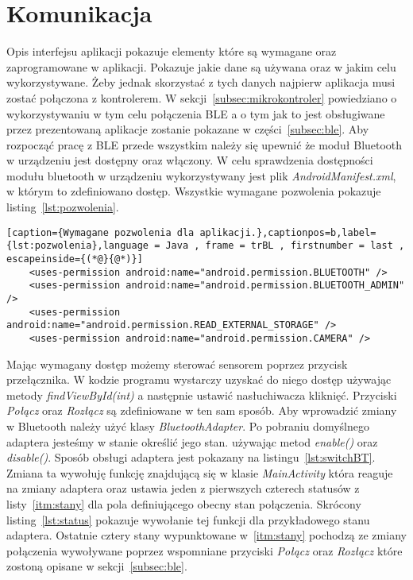 \section{Komunikacja}
\label{sec:komunikacja}
Opis interfejsu aplikacji pokazuje elementy które są wymagane oraz zaprogramowane w aplikacji. Pokazuje jakie dane są używana oraz w jakim celu wykorzystywane. Żeby jednak skorzystać z tych danych najpierw aplikacja musi zostać połączona z kontrolerem. W sekcji~\ref{subsec:mikrokontroler} powiedziano o wykorzystywaniu w tym celu połączenia BLE a o tym jak to jest obsługiwane przez prezentowaną aplikacje zostanie pokazane w części~\ref{subsec:ble}. Aby rozpocząć pracę z BLE przede wszystkim należy się upewnić że moduł Bluetooth w urządzeniu jest dostępny oraz włączony. W celu sprawdzenia dostępności modułu bluetooth w urządzeniu wykorzystywany jest plik \textit{AndroidManifest.xml}, w którym to zdefiniowano dostęp. Wszystkie wymagane pozwolenia pokazuje listing~\ref{lst:pozwolenia}.
	\begin{lstlisting}[caption={Wymagane pozwolenia dla aplikacji.},captionpos=b,label={lst:pozwolenia},language = Java , frame = trBL , firstnumber = last , escapeinside={(*@}{@*)}]
    <uses-permission android:name="android.permission.BLUETOOTH" />
    <uses-permission android:name="android.permission.BLUETOOTH_ADMIN" />
    <uses-permission android:name="android.permission.READ_EXTERNAL_STORAGE" />
    <uses-permission android:name="android.permission.CAMERA" />
\end{lstlisting}
Mając wymagany dostęp możemy sterować sensorem poprzez przycisk przełącznika. W kodzie programu wystarczy uzyskać do niego dostęp używając metody \textit{findViewById(int)} a następnie ustawić nasłuchiwacza kliknięć. Przyciski \textit{Połącz} oraz \textit{Rozłącz} są zdefiniowane w ten sam sposób. Aby wprowadzić zmiany w Bluetooth należy użyć klasy \textit{BluetoothAdapter}. Po pobraniu domyślnego adaptera jesteśmy w stanie określić jego stan. używając metod \textit{enable()} oraz \textit{disable()}. Sposób obsługi adaptera jest pokazany na listingu~\ref{lst:switchBT}. Zmiana ta wywołuję funkcję znajdującą się w klasie \textit{MainActivity} która reaguje na zmiany adaptera oraz ustawia jeden z pierwszych czterech statusów z listy~\ref{itm:stany} dla pola definiującego obecny stan połączenia. Skrócony listing~\ref{lst:status} pokazuje wywołanie tej funkcji dla przykładowego stanu adaptera. Ostatnie cztery stany wypunktowane w~\ref{itm:stany} pochodzą ze zmiany połączenia wywoływane poprzez wspomniane przyciski \textit{Połącz} oraz \textit{Rozłącz} które zostoną opisane w sekcji~\ref{subsec:ble}.
